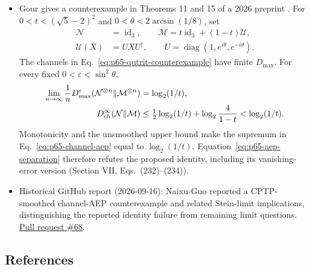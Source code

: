 \begin{itemize}
  \item Gour gives a counterexample in Theorems 11 and 15 of a 2026 preprint
  .  For
  $0<t<(\sqrt5-2)^2$ and $0<\theta<2\arcsin(1/8)$, set
  \begin{equation}
    \begin{aligned}
      \mathcal N&=\operatorname{id}_3,\qquad
      \mathcal M=t\operatorname{id}_3+(1-t)\mathcal U,\\
      \mathcal U(X)&=UXU^\dagger,\qquad
      U=\operatorname{diag}(1,e^{i\theta},e^{-i\theta}).
    \end{aligned}
    \label{eq:p65-qutrit-counterexample}
  \end{equation}
  The channels in Eq.~\eqref{eq:p65-qutrit-counterexample} have finite
  $D_{\max}$.  For every fixed $0<\varepsilon<\sin^2\theta$,
  \begin{equation}
    \begin{aligned}
      \lim_{n\to\infty}\frac1nD_{\max}^{\varepsilon}
        (\mathcal N^{\otimes n}\|\mathcal M^{\otimes n})
        &=\log_2(1/t),\\
      D_{\rm ch}^{\infty}(\mathcal N\|\mathcal M)
        &\leq\tfrac12\log_2(1/t)+\log_2\frac4{1-t}
        <\log_2(1/t).
    \end{aligned}
    \label{eq:p65-aep-separation}
  \end{equation}
  Monotonicity and the unsmoothed upper bound make the supremum in
  Eq.~\eqref{eq:p65-channel-aep} equal to $\log_2(1/t)$.
  Equation~\eqref{eq:p65-aep-separation} therefore refutes the proposed
  identity, including its vanishing-error version (Section VII, Eqs.~(232)--(234)).

  \item Historical GitHub report (2026-09-16): Naixu-Guo reported a CPTP-smoothed channel-AEP counterexample and related Stein-limit implications, distinguishing the reported identity failure from remaining limit questions. \href{https://github.com/Naixu-Guo/quantum-open-problems/pull/68}{Pull request \#68}.
\end{itemize}

\subsection*{References}

